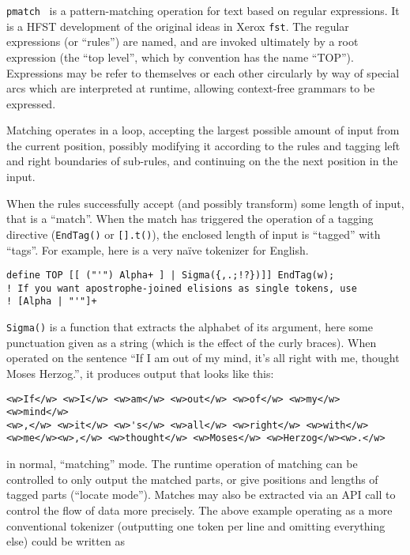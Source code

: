 \documentclass{llncs}
\begin{document}
\verb+pmatch+~\cite{hfst-pmatch} is a pattern-matching operation for text based
on regular expressions. It is a HFST development of the original ideas in Xerox
\verb+fst+. The regular expressions (or ``rules'') are named, and are
invoked ultimately by a root expression (the ``top level'', which by convention
has the name ``TOP''). Expressions may be refer to themselves or each other
circularly by way of special arcs which are interpreted at runtime, allowing
context-free grammars to be expressed.

Matching operates in a loop, accepting the largest
possible amount of input from the current position, possibly modifying it
according to the rules and tagging left and right boundaries of sub-rules, and
continuing on the the next position in the input.

When the rules successfully accept (and possibly transform) some length of
input, that is a ``match''.
When the match has triggered the operation of a tagging directive
(\verb+EndTag()+ or \verb+[].t()+), the enclosed length of input is ``tagged'' with
``tags''. For example, here is a very naïve tokenizer for English.

\begin{verbatim}
define TOP [[ ("'") Alpha+ ] | Sigma({,.;!?})]] EndTag(w);
! If you want apostrophe-joined elisions as single tokens, use
! [Alpha | "'"]+
\end{verbatim}

\verb+Sigma()+ is a function that extracts the alphabet of its argument, here
some punctuation given as a string (which is the effect of the curly braces).
When operated on the sentence
``If I am out of my mind, it's all right with me, thought Moses Herzog.'',
it produces output that looks like this:

\begin{verbatim}
<w>If</w> <w>I</w> <w>am</w> <w>out</w> <w>of</w> <w>my</w> <w>mind</w>
<w>,</w> <w>it</w> <w>'s</w> <w>all</w> <w>right</w> <w>with</w>
<w>me</w><w>,</w> <w>thought</w> <w>Moses</w> <w>Herzog</w><w>.</w>
\end{verbatim}

in normal, ``matching'' mode. The runtime operation of matching can be
controlled to only output the matched parts, or give positions and
lengths of tagged parts (``locate mode''). Matches may also be extracted
via an API call to control the flow of data more precisely. The above example
operating as a more conventional tokenizer (outputting one token per line and
omitting everything else) could be written as
\end{document}
